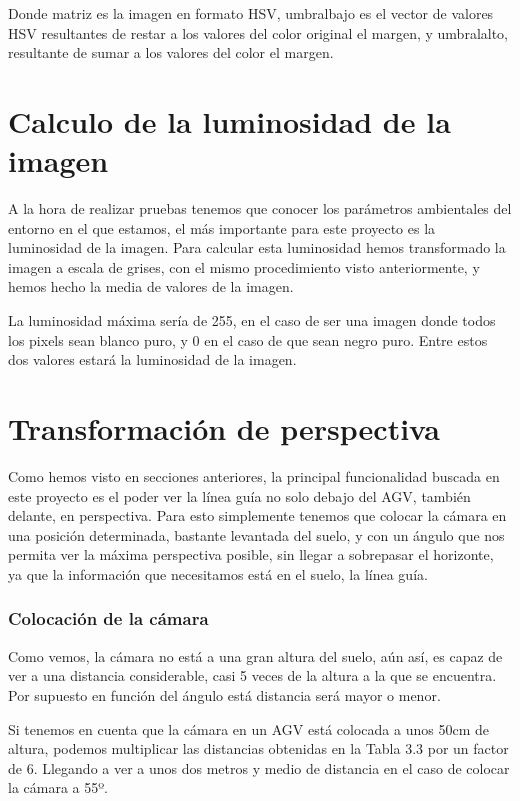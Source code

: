 Donde matriz es la imagen en formato HSV, umbralbajo es el vector de valores HSV resultantes de restar a los valores del color original el margen, y umbralalto, resultante de sumar a los valores del color el margen.

\section{Calculo de la luminosidad de la imagen}
A la hora de realizar pruebas tenemos que conocer los parámetros ambientales del entorno en el que estamos, el más importante para este proyecto es la luminosidad de la imagen. Para calcular esta luminosidad hemos transformado la imagen a escala de grises, con el mismo procedimiento visto anteriormente, y hemos hecho la media de valores de la imagen.

La luminosidad máxima sería de 255, en el caso de ser una imagen donde todos los pixels sean blanco puro, y 0 en el caso de que sean negro puro. Entre estos dos valores estará la luminosidad de la imagen.


\section{Transformación de perspectiva}
Como hemos visto en secciones anteriores, la principal funcionalidad buscada en este proyecto es el poder ver la línea guía no solo debajo del AGV, también delante, en perspectiva. Para esto simplemente tenemos que colocar la cámara en una posición determinada, bastante levantada del suelo, y con un ángulo que nos permita ver la máxima perspectiva posible, sin llegar a sobrepasar el horizonte, ya que la información que necesitamos está en el suelo, la línea guía.

\subsubsection{Colocación de la cámara}


Como vemos, la cámara no está a una gran altura del suelo, aún así, es capaz de ver a una distancia considerable, casi 5 veces de la altura a la que se encuentra. Por supuesto en función del ángulo está distancia será mayor o menor. 

Si tenemos en cuenta que la cámara en un AGV está colocada a unos 50cm de altura, podemos multiplicar las distancias obtenidas en la Tabla 3.3 por un factor de 6. Llegando a ver a unos dos metros y medio de distancia en el caso de colocar la cámara a 55º.

